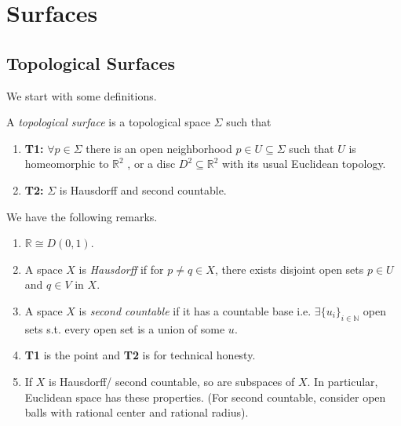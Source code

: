 \section{Surfaces}
\subsection{Topological Surfaces}
We start with some definitions.
\begin{definition}
    A \textit{topological surface} is a topological space \(\Sigma\) such that
    \begin{enumerate}
        \item \textbf{T1:} \(\forall p \in \Sigma\) there is an open neighborhood \(p \in U \subseteq \Sigma\) such that \(U\) is homeomorphic to \(\mathbb{R}^2\) , or a disc \(D^2 \subseteq \mathbb{R}^2\) with its usual Euclidean topology.
        \item \textbf{T2:} \(\Sigma\) is Hausdorff and second countable.
    \end{enumerate}
\end{definition}
\begin{remark}
    We have the following remarks.
    \begin{enumerate}
        \item \(\mathbb{R}\cong D(0,1)\).
        \item A space \(X\) is \textit{Hausdorff} if for \(p \neq q \in X\), there exists disjoint open sets \(p \in U\) and \(q \in V\) in \(X\).
        \item A space \(X\) is \textit{second countable} if it has a countable base i.e. \(\exists \{u_i\}_{i \in \mathbb{N}}\) open sets s.t. every open set is a union of some \(u\).
        \item \textbf{T1} is the point and \textbf{T2} is for technical honesty.
        \item If \(X\) is Hausdorff/ second countable, so are subspaces of \(X\). In particular, Euclidean space has these properties. (For second countable, consider open balls with rational center and rational radius).
    \end{enumerate}
\end{remark}
